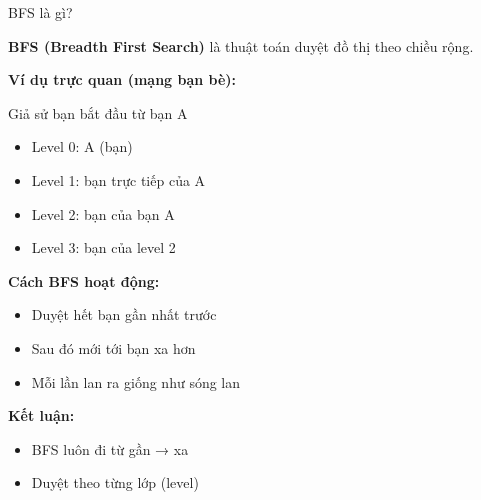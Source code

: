 \documentclass{beamer}
\newcommand{\hlblue}[1]{\textcolor{myblue}{#1}}
\newcommand{\hlgreen}[1]{\textcolor{mygreen}{#1}}
\newcommand{\hlred}[1]{\textcolor{myred}{#1}}
\newcommand{\hlorange}[1]{\textcolor{myorange}{#1}}
\begin{document}
\begin{frame}{BFS là gì?}

\textbf{BFS (Breadth First Search)} là thuật toán duyệt đồ thị theo \hlblue{chiều rộng}.

\vspace{6pt}

\textbf{Ví dụ trực quan (mạng bạn bè):}

Giả sử bạn bắt đầu từ \hlred{bạn A}

\begin{itemize}
\item Level 0: A (bạn)
\item Level 1: bạn trực tiếp của A
\item Level 2: bạn của bạn A
\item Level 3: bạn của level 2
\end{itemize}

\vspace{6pt}

\textbf{Cách BFS hoạt động:}
\begin{itemize}
\item Duyệt hết \hlgreen{bạn gần nhất} trước
\item Sau đó mới tới \hlorange{bạn xa hơn}
\item Mỗi lần lan ra giống như \hlblue{sóng lan}
\end{itemize}

\vspace{6pt}

\textbf{Kết luận:}
\begin{itemize}
\item BFS luôn đi từ \hlred{gần → xa}
\item Duyệt theo từng \hlblue{lớp (level)}
\end{itemize}

\end{frame}
\end{document}
